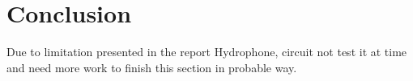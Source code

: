 \section{Conclusion}\label{sec:conclusion}
Due to limitation presented in the report Hydrophone, circuit not test it at time and need more work to finish this section in probable way.  

